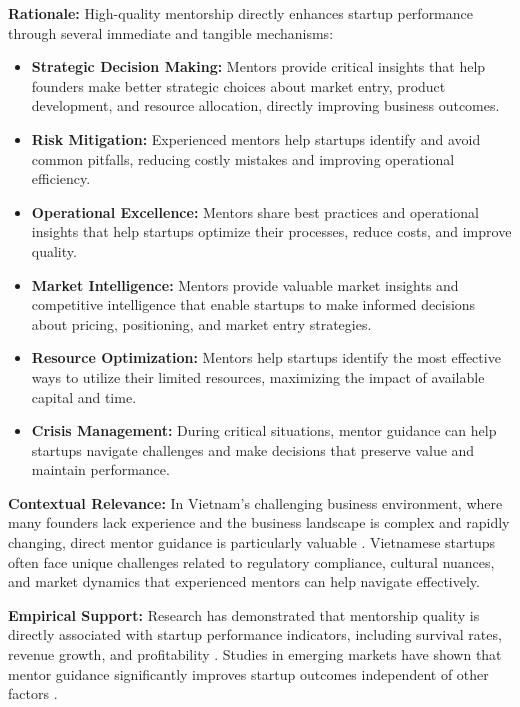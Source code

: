 \documentclass[../Main.tex]{subfiles}
\begin{document}
    \textbf{Rationale:} High-quality mentorship directly enhances startup performance through several immediate and tangible mechanisms:
    \begin{itemize}
        \item \textbf{Strategic Decision Making:} Mentors provide critical insights that help founders make better strategic choices about market entry, product development, and resource allocation, directly improving business outcomes.
        \item \textbf{Risk Mitigation:} Experienced mentors help startups identify and avoid common pitfalls, reducing costly mistakes and improving operational efficiency.
        \item \textbf{Operational Excellence:} Mentors share best practices and operational insights that help startups optimize their processes, reduce costs, and improve quality.
        \item \textbf{Market Intelligence:} Mentors provide valuable market insights and competitive intelligence that enable startups to make informed decisions about pricing, positioning, and market entry strategies.
        \item \textbf{Resource Optimization:} Mentors help startups identify the most effective ways to utilize their limited resources, maximizing the impact of available capital and time.
        \item \textbf{Crisis Management:} During critical situations, mentor guidance can help startups navigate challenges and make decisions that preserve value and maintain performance.
    \end{itemize}
    
    \textbf{Contextual Relevance:} In Vietnam's challenging business environment, where many founders lack experience and the business landscape is complex and rapidly changing, direct mentor guidance is particularly valuable \cite{dinh2017promoting}. Vietnamese startups often face unique challenges related to regulatory compliance, cultural nuances, and market dynamics that experienced mentors can help navigate effectively.
    
    \textbf{Empirical Support:} Research has demonstrated that mentorship quality is directly associated with startup performance indicators, including survival rates, revenue growth, and profitability \cite{stjean2012mentoring}. Studies in emerging markets have shown that mentor guidance significantly improves startup outcomes independent of other factors \cite{sullivan2011effectiveness}.
    
\end{document}
